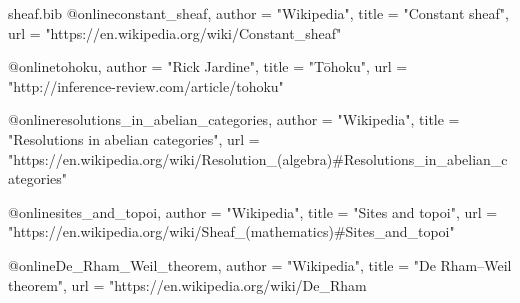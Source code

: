 \documentclass[UTF8]{ctexart}
\begin{document}
\begin{filecontents*}{sheaf.bib}
@online{constant_sheaf,
author = "Wikipedia",
title = "Constant sheaf",
url = "https://en.wikipedia.org/wiki/Constant_sheaf"
}

@online{tohoku,
author = "Rick Jardine",
title = "Tōhoku",
url = "http://inference-review.com/article/tohoku"
}

@online{resolutions_in_abelian_categories,
author = "Wikipedia",
title = "Resolutions in abelian categories",
url = "https://en.wikipedia.org/wiki/Resolution_(algebra)#Resolutions_in_abelian_categories"
}

@online{sites_and_topoi,
author = "Wikipedia",
title = "Sites and topoi",
url = "https://en.wikipedia.org/wiki/Sheaf_(mathematics)#Sites_and_topoi"
}

@online{De_Rham_Weil_theorem,
author = "Wikipedia",
title = "De Rham–Weil theorem",
url = "https://en.wikipedia.org/wiki/De_Rham%
}
\end{filecontents*}

\newpage
\printbibliography
\end{document}
